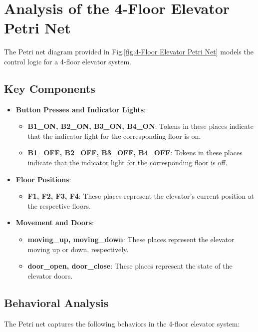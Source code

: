 \documentclass[12pt	]{article}
\begin{document}
\section{Analysis of the 4-Floor Elevator Petri Net}

The Petri net diagram provided in Fig.\ref{fig:4-Floor Elevator Petri Net} models the control logic for a 4-floor elevator system. 


\subsection{Key Components}

\begin{itemize}
	\item \textbf{Button Presses and Indicator Lights}:
	\begin{itemize}
		\item \textbf{B1\_ON, B2\_ON, B3\_ON, B4\_ON}: Tokens in these places indicate that the indicator light for the corresponding floor is on.
		\item \textbf{B1\_OFF, B2\_OFF, B3\_OFF, B4\_OFF}: Tokens in these places indicate that the indicator light for the corresponding floor is off.
	\end{itemize}
	\item \textbf{Floor Positions}:
	\begin{itemize}
		\item \textbf{F1, F2, F3, F4}: These places represent the elevator's current position at the respective floors.
	\end{itemize}
	\item \textbf{Movement and Doors}:
	\begin{itemize}
		\item \textbf{moving\_up, moving\_down}: These places represent the elevator moving up or down, respectively.
		\item \textbf{door\_open, door\_close}: These places represent the state of the elevator doors.
	\end{itemize}
\end{itemize}

\subsection{Behavioral Analysis}

The Petri net captures the following behaviors in the 4-floor elevator system:
\end{document}
